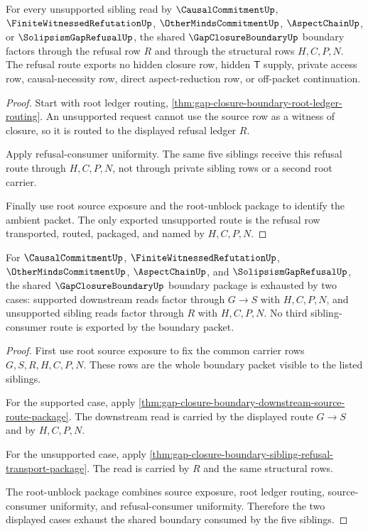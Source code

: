 \begin{theorem}
\label{thm:gap-closure-boundary-sibling-refusal-transport-package}
For every unsupported sibling read by $\CausalCommitmentUp$, $\FiniteWitnessedRefutationUp$, $\OtherMindsCommitmentUp$, $\AspectChainUp$, or $\SolipsismGapRefusalUp$, the shared $\GapClosureBoundaryUp$ boundary factors through the refusal row $R$ and through the structural rows $H,C,P,N$. The refusal route exports no hidden closure row, hidden $\mathsf{T}$ supply, private access row, causal-necessity row, direct aspect-reduction row, or off-packet continuation.
\end{theorem}
\begin{proof}
Start with root ledger routing, \autoref{thm:gap-closure-boundary-root-ledger-routing}. An unsupported request cannot use the source row as a witness of closure, so it is routed to the displayed refusal ledger $R$.

Apply refusal-consumer uniformity. The same five siblings receive this refusal route through $H,C,P,N$, not through private sibling rows or a second root carrier.

Finally use root source exposure and the root-unblock package to identify the ambient packet. The only exported unsupported route is the refusal row transported, routed, packaged, and named by $H,C,P,N$.
\end{proof}

\begin{theorem}
\label{thm:gap-closure-boundary-shared-boundary-consumer-package}
For $\CausalCommitmentUp$, $\FiniteWitnessedRefutationUp$, $\OtherMindsCommitmentUp$, $\AspectChainUp$, and $\SolipsismGapRefusalUp$, the shared $\GapClosureBoundaryUp$ boundary package is exhausted by two cases: supported downstream reads factor through $G \longrightarrow S$ with $H,C,P,N$, and unsupported sibling reads factor through $R$ with $H,C,P,N$. No third sibling-consumer route is exported by the boundary packet.
\end{theorem}
\begin{proof}
First use root source exposure to fix the common carrier rows $G,S,R,H,C,P,N$. These rows are the whole boundary packet visible to the listed siblings.

For the supported case, apply \autoref{thm:gap-closure-boundary-downstream-source-route-package}. The downstream read is carried by the displayed route $G \longrightarrow S$ and by $H,C,P,N$.

For the unsupported case, apply \autoref{thm:gap-closure-boundary-sibling-refusal-transport-package}. The read is carried by $R$ and the same structural rows.

The root-unblock package combines source exposure, root ledger routing, source-consumer uniformity, and refusal-consumer uniformity. Therefore the two displayed cases exhaust the shared boundary consumed by the five siblings.
\end{proof}

